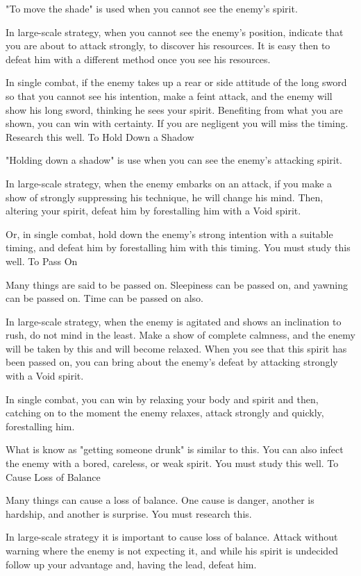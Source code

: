 "To move the shade" is used when you cannot see the enemy's spirit.

In large-scale strategy, when you cannot see the enemy's position, indicate that you are about to attack strongly, to discover his resources. It is easy then to defeat him with a different method once you see his resources.

In single combat, if the enemy takes up a rear or side attitude of the long sword so that you cannot see his intention, make a feint attack, and the enemy will show his long sword, thinking he sees your spirit. Benefiting from what you are shown, you can win with certainty. If you are negligent you will miss the timing. Research this well.
To Hold Down a Shadow

"Holding down a shadow" is use when you can see the enemy's attacking spirit.

In large-scale strategy, when the enemy embarks on an attack, if you make a show of strongly suppressing his technique, he will change his mind. Then, altering your spirit, defeat him by forestalling him with a Void spirit.

Or, in single combat, hold down the enemy's strong intention with a suitable timing, and defeat him by forestalling him with this timing. You must study this well.
To Pass On

Many things are said to be passed on. Sleepiness can be passed on, and yawning can be passed on. Time can be passed on also.

In large-scale strategy, when the enemy is agitated and shows an inclination to rush, do not mind in the least. Make a show of complete calmness, and the enemy will be taken by this and will become relaxed. When you see that this spirit has been passed on, you can bring about the enemy's defeat by attacking strongly with a Void spirit.

In single combat, you can win by relaxing your body and spirit and then, catching on to the moment the enemy relaxes, attack strongly and quickly, forestalling him.

What is know as "getting someone drunk" is similar to this. You can also infect the enemy with a bored, careless, or weak spirit. You must study this well.
To Cause Loss of Balance

Many things can cause a loss of balance. One cause is danger, another is hardship, and another is surprise. You must research this.

In large-scale strategy it is important to cause loss of balance. Attack without warning where the enemy is not expecting it, and while his spirit is undecided follow up your advantage and, having the lead, defeat him.

